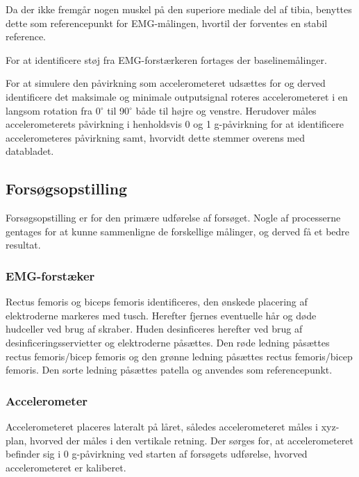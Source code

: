 Da der ikke fremgår nogen muskel på den superiore mediale del af tibia, benyttes dette som referencepunkt for EMG-målingen, hvortil der forventes en stabil reference. 





For at identificere støj fra EMG-forstærkeren fortages der baselinemålinger.


For at simulere den påvirkning som accelerometeret udsættes for og derved identificere det maksimale og minimale outputsignal roteres accelerometeret i en langsom rotation fra 0$^{\circ}$ til 90$^{\circ}$ både til højre og venstre. Herudover måles accelerometerets påvirkning i henholdsvis 0 og 1 g-påvirkning for at identificere accelerometeres påvirkning samt, hvorvidt dette stemmer overens med databladet. 

\subsection{Forsøgsopstilling}
Forsøgsopstilling er for den primære udførelse af forsøget. Nogle af processerne gentages for at kunne sammenligne de forskellige målinger, og derved få et bedre resultat.

\subsubsection{EMG-forstæker}
Rectus femoris og biceps femoris identificeres, den ønskede placering af elektroderne markeres med tusch. Herefter fjernes eventuelle hår og døde hudceller ved brug af skraber. Huden desinficeres herefter ved brug af desinficeringsservietter og elektroderne påsættes. Den røde ledning påsættes rectus femoris/bicep femoris og den grønne ledning påsættes rectus femoris/bicep femoris. Den sorte ledning påsættes patella og anvendes som referencepunkt.

\subsubsection{Accelerometer}
Accelerometeret placeres lateralt på låret, således accelerometeret måles i xyz-plan, hvorved der måles i den vertikale retning. Der sørges for, at accelerometeret befinder sig i 0 g-påvirkning ved starten af forsøgets udførelse, hvorved accelerometeret er kaliberet. 

